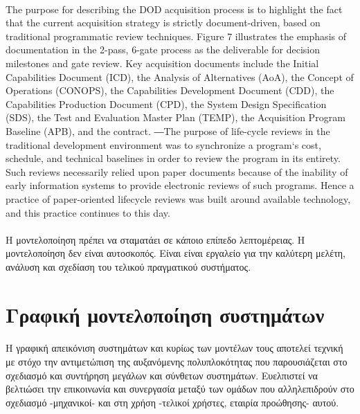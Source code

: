 \documentclass[a4paper,12pt,twoside]{report}
\begin{document}
			\paragraph{} {The purpose for describing the DOD acquisition process is to highlight the fact that the current acquisition strategy is strictly document-driven, based on traditional programmatic review techniques. Figure 7 illustrates the emphasis of documentation in the 2-pass, 6-gate process as the deliverable for decision milestones and gate review. Key acquisition documents include the Initial Capabilities Document (ICD), the Analysis of Alternatives (AoA), the Concept of Operations (CONOPS), the Capabilities Development Document (CDD), the Capabilities Production Document (CPD), the System Design Specification (SDS), the Test and Evaluation Master Plan (TEMP), the Acquisition Program Baseline (APB), and the contract. ―The purpose of life-cycle reviews in the traditional development environment was to synchronize a program‘s cost, schedule, and technical baselines in order to review the program in its entirety. Such reviews necessarily relied upon paper documents because of the inability of early information systems to provide electronic reviews of such programs. Hence a practice of paper-oriented lifecycle reviews was built around available technology, and this practice continues to this day. \cite{MDSysDevelIBM}
			}
			
			\paragraph{} {Η μοντελοποίηση πρέπει να σταματάει σε κάποιο επίπεδο λεπτομέρειας. Η μοντελοποίηση δεν είναι αυτοσκοπός. Είναι είναι εργαλείο για την καλύτερη μελέτη, ανάλυση και σχεδίαση του τελικού πραγματικού συστήματος.
			}
			
		\section{Γραφική μοντελοποίηση συστημάτων}
			
			\paragraph{}{
				H γραφική απεικόνιση συστημάτων και κυρίως των μοντέλων τους αποτελεί τεχνική με στόχο την αντιμετώπιση της αυξανόμενης πολυπλοκότητας που παρουσιάζεται στο σχεδιασμό και συντήρηση μεγάλων και σύνθετων συστημάτων. Ευελπιστεί να βελτιώσει  την επικοινωνία και συνεργασία μεταξύ των ομάδων που αλληλεπιδρούν στο σχεδιασμό -μηχανικοί- και στη χρήση -τελικοί χρήστες, εταιρία προώθησης- αυτού. \cite{SMSpacecraft}
				}
\end{document}
